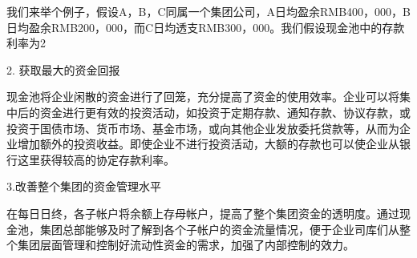     我们来举个例子，假设A，B，C同属一个集团公司，A日均盈余RMB400，000，B日均盈余RMB200，000，而C日均透支RMB300，000。我们假设现金池中的存款利率为2%

    2. 获取最大的资金回报

    现金池将企业闲散的资金进行了回笼，充分提高了资金的使用效率。企业可以将集中后的资金进行更有效的投资活动，如投资于定期存款、通知存款、协议存款，或投资于国债市场、货币市场、基金市场，或向其他企业发放委托贷款等，从而为企业增加额外的投资收益。即使企业不进行投资活动，大额的存款也可以使企业从银行这里获得较高的协定存款利率。

    3.改善整个集团的资金管理水平

    在每日日终，各子帐户将余额上存母帐户，提高了整个集团资金的透明度。通过现金池，集团总部能够及时了解到各个子帐户的资金流量情况，便于企业司库们从整个集团层面管理和控制好流动性资金的需求，加强了内部控制的效力。
